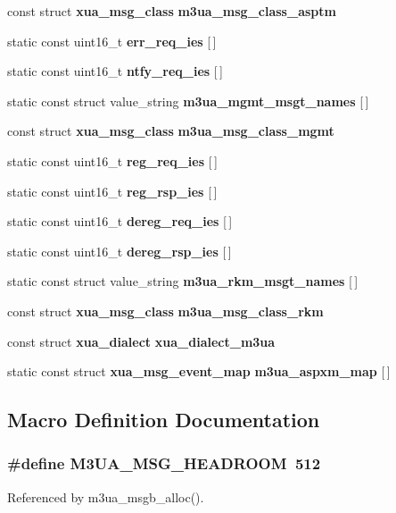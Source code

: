 \begin{DoxyCompactItemize}
const struct {\bf xua\+\_\+msg\+\_\+class} {\bf m3ua\+\_\+msg\+\_\+class\+\_\+asptm}
\item 
static const uint16\+\_\+t {\bf err\+\_\+req\+\_\+ies} [$\,$]
\item 
static const uint16\+\_\+t {\bf ntfy\+\_\+req\+\_\+ies} [$\,$]
\item 
static const struct value\+\_\+string {\bf m3ua\+\_\+mgmt\+\_\+msgt\+\_\+names} [$\,$]
\item 
const struct {\bf xua\+\_\+msg\+\_\+class} {\bf m3ua\+\_\+msg\+\_\+class\+\_\+mgmt}
\item 
static const uint16\+\_\+t {\bf reg\+\_\+req\+\_\+ies} [$\,$]
\item 
static const uint16\+\_\+t {\bf reg\+\_\+rsp\+\_\+ies} [$\,$]
\item 
static const uint16\+\_\+t {\bf dereg\+\_\+req\+\_\+ies} [$\,$]
\item 
static const uint16\+\_\+t {\bf dereg\+\_\+rsp\+\_\+ies} [$\,$]
\item 
static const struct value\+\_\+string {\bf m3ua\+\_\+rkm\+\_\+msgt\+\_\+names} [$\,$]
\item 
const struct {\bf xua\+\_\+msg\+\_\+class} {\bf m3ua\+\_\+msg\+\_\+class\+\_\+rkm}
\item 
const struct {\bf xua\+\_\+dialect} {\bf xua\+\_\+dialect\+\_\+m3ua}
\item 
static const struct {\bf xua\+\_\+msg\+\_\+event\+\_\+map} {\bf m3ua\+\_\+aspxm\+\_\+map} [$\,$]
\end{DoxyCompactItemize}


\subsection{Macro Definition Documentation}
\subsubsection[{M3\+U\+A\+\_\+\+M\+S\+G\+\_\+\+H\+E\+A\+D\+R\+O\+OM}]{\setlength{\rightskip}{0pt plus 5cm}\#define M3\+U\+A\+\_\+\+M\+S\+G\+\_\+\+H\+E\+A\+D\+R\+O\+OM~512}\label{m3ua_8c_a0a663c3db596ddb20df217c428675585}


Referenced by m3ua\+\_\+msgb\+\_\+alloc().

